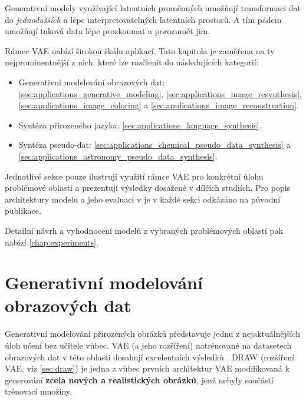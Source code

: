 Generativní modely využívající latentních proměnných umožňují transformaci dat
do \emph{jednodušších} a lépe interpretovatelných latentních prostorů.
A tím pádem umožňují taková data lépe prozkoumat a porozumět jim. \cite{Kingma2019}

Rámec VAE nabízí širokou škálu aplikací.
Tato kapitola je zaměřena na ty nejprominentnější z nich, které lze rozčlenit do následujících kategorií:

\begin{itemize}
    \item Generativní modelování obrazových dat: \autoref{sec:applications_generative_modeling}, \autoref{sec:applications_image_resynthesis}, \autoref{sec:applications_image_coloring} a \autoref{sec:applications_image_reconstruction}.
    \item Syntéza přirozeného jazyka: \autoref{sec:applications_language_synthesis}. 
    \item Syntéza pseudo-dat: \autoref{sec:applications_chemical_pseudo_data_synthesis} a \autoref{sec:applications_astronomy_pseudo_data_synthesis}.
\end{itemize}

Jednotlivé sekce pouze ilustrují využití rámce VAE pro konkrétní úlohu problémové oblasti a prezentují výsledky dosažené v dílčích studiích.
Pro popis architektury modelu a jeho evaluaci v je v každé sekci odkázáno na původní publikace.

Detailní návrh a vyhodnocení modelů z vybraných problémových oblastí pak nabízí \autoref{chap:experiments}. 

\newpage
\section{Generativní modelování obrazových dat}
\label{sec:applications_generative_modeling}
Generativní modelování přirozených obrázků představuje jednu z nejaktuálnějších úloh učení bez učitele vůbec.
VAE (a jeho rozšíření) natrénované na datasetech obrazových dat v této oblasti dosahují excelentních výsledků \cite{Gulrajani2016}.
DRAW (rozšíření VAE, viz \autoref{sec:draw}) je jedna z vůbec prvních architektur VAE modifikovaná k generování \textbf{zcela nových a realistických obrázků}, jenž nebyly součástí trénovací množiny.

